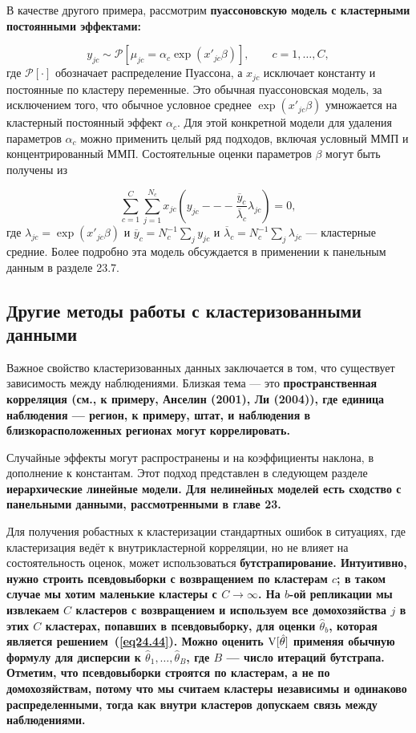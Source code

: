 В качестве другого примера, рассмотрим \bfseries пуассоновскую модель с кластерными постоянными эффектами: \mdseries

$$
y_{jc} \sim \mathcal P [\mu_{jc} = \alpha_c \exp(x'_{jc} \beta)], \qquad c=1, \dots, C, 
$$
где $\mathcal P[\cdot]$ обозначает распределение Пуассона, а $x_{jc}$ исключает константу и постоянные по кластеру переменные. Это обычная пуассоновская модель, за исключением того, что обычное условное среднее $\exp(x'_{jc} \beta)$ умножается на кластерный постоянный эффект $\alpha_c$. Для этой конкретной модели для удаления параметров $\alpha_c$ можно применить целый ряд подходов, включая условный ММП и концентрированный ММП. Состоятельные оценки параметров $\beta$ могут быть получены из 

$$
\sum_{c=1}^C \sum_{j=1}^{N_c} x_{jc} \left( y_{jc} --- \frac{\overline{y}_c}{\overline{\lambda}_c} \lambda_{jc} \right) =0,
$$
где $\lambda_{jc} = \exp(x'_{jc}\beta)$ и $\overline{y}_c = N_c^{-1} \sum_j y_{jc}$ и $\overline{\lambda}_c = N_c^{-1} \sum_j \lambda_{jc}$ --- кластерные средние. Более подробно эта модель обсуждается в применении к панельным данным в разделе 23.7. 

\subsection{Другие методы работы с кластеризованными данными}

Важное свойство кластеризованных данных заключается в том, что существует зависимость между наблюдениями. Близкая тема --- это \bfseries пространственная корреляция \mdseries (см., к примеру, Анселин (2001), Ли (2004)), где единица наблюдения --- регион, к примеру, штат, и наблюдения в близкорасположенных регионах могут коррелировать. 

Случайные эффекты могут распространены и на коэффициенты наклона, в дополнение к константам. Этот подход представлен в следующем разделе \bfseries иерархические линейные модели\mdseries. Для нелинейных моделей есть сходство с панельными данными, рассмотренными в главе 23. 

Для получения робастных к кластеризации стандартных ошибок в ситуациях, где кластеризация ведёт к внутрикластерной корреляции, но не влияет на состоятельность оценок, может использоваться \bfseries бутстрапирование. \mdseries Интуитивно, нужно строить псевдовыборки с возвращением по кластерам $c$; в таком случае мы хотим маленькие кластеры с $C \to \infty$. На $b$-ой репликации мы извлекаем $C$ кластеров с возвращением и используем все домохозяйства $j$ в этих $C$ кластерах, попавших в псевдовыборку, для оценки $\hat \theta_b$, которая является решением~(\ref{eq24.44}). Можно оценить $\mathrm{V}[\hat \theta]$ применяя обычную формулу для дисперсии к $\hat \theta_1, \dots, \hat \theta_B$, где $B$ --- число итераций бутстрапа. Отметим, что псевдовыборки строятся по кластерам, а не по домохозяйствам, потому что мы считаем кластеры независимы и одинаково распределенными, тогда как внутри кластеров допускаем связь между наблюдениями. 


